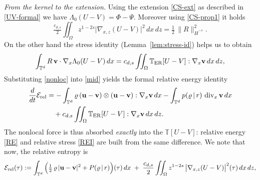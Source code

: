 \documentclass[12pt,a4paper,twoside]{article}
\newcommand{\vr}{\varrho}
\newcommand{\vu}{\vc{u}}
\newcommand{\vv}{\vc{v}}
\newcommand{\vc}[1]{{\bf #1}}
\newcommand{\Erel}{\mathcal{E}_{\mathrm{rel}}}
\numberwithin{equation}{section}%
\newcommand{\T}{\mathbb{T}}
\newcommand{\Gradx}{\nabla_x}
\newcommand{\Gradxz}{\nabla_{x,z}}
\newcommand{\Divx}{\operatorname{div}_x}
\newcommand{\Lambdaz}{\Lambda_0}
\begin{document}
\emph{From the kernel to the extension.}
Using the extension \eqref{CS-ext} as described in \eqref{UV-formal} we have  $\Lambdaz(U-V)=\Phi-\Psi$. Moreover using \eqref{CS-prop1} it holds
\begin{equation}\label{iso}
	\tfrac{c_{d,s}}2\iint_\Omega z^{1-2s}\big|\Gradxz(U-V)\big|^2\,dx\,dz
	=\tfrac12\,\|R\|_{\dot H^{-s}}^2.
\end{equation}
On the other hand the stress identity (Lemma~\ref{lem:stress-id}) helps us to obtain
\begin{equation}\label{nonloc}
	\int_{\mathbb T^d} R\,\vv\cdot\Gradx\Lambdaz(U-V)\,dx
	=c_{d,s}\iint_\Omega \T_{\rm ER}[U-V]:\Gradx\vv\,dx\,dz,	
\end{equation}
Substituting \eqref{nonloc} into \eqref{mid} yields the formal relative energy identity
\begin{equation}\label{REI}
	\begin{aligned}
		\frac{d}{dt}\Erel
		&=-\int_{\mathbb T^d}\vr\,(\vu-\vv)\otimes(\vu-\vv):\Gradx\vv\,dx
		-\int_{\mathbb T^d} p(\vr\,|\,r)\,\Divx\vv\,dx \\
		&\quad +c_{d,s}\iint_\Omega \T_{\rm ER}[U-V]:\Gradx\vv\,dx\,dz .
	\end{aligned}
\end{equation}
The nonlocal force is thus absorbed \emph{exactly} into the $\mathbb{T}[U-V]$: relative energy \eqref{RE} and relative stress \eqref{REI} are built from the same difference.
We note that now, the relative entropy is
\begin{equation*}
	\Erel(\tau)
	:= \int_{\mathbb T^d}\Big( \tfrac12\,\vr\,|\vu - \vv|^2 + P(\vr\,|\,r) \Big)(\tau)\,dx
	\;+\; \frac{c_{d,s}}{2}\iint_\Omega z^{1-2s}\,\big|\Gradxz (U-V)\big|^2(\tau)\,dx\,dz,
\end{equation*} 
\end{document}
